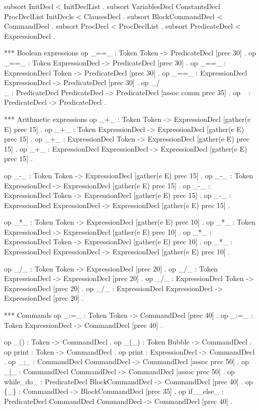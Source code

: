 \documentclass[a4paper,openany]{book}
\begin{document}
 subsort InitDecl < InitDeclList .
 subsort VariablesDecl ConstantsDecl ProcDeclList 
         InitDecls < ClausesDecl .
 subsort BlockCommandDecl < CommandDecl .
 subsort ProcDecl < ProcDeclList .
 subsort PredicateDecl < ExpressionDecl .

 *** Boolean expressions
 op _==_ : Token Token -> PredicateDecl [prec 30] .
 op _==_ : Token ExpressionDecl -> PredicateDecl [prec 30] .
 op _==_ : ExpressionDecl Token -> PredicateDecl [prec 30] .
 op _==_ : ExpressionDecl ExpressionDecl -> PredicateDecl 
           [prec 30] .
 op _/\\_ : PredicateDecl PredicateDecl -> PredicateDecl 
           [assoc comm prec 35] .
 op ~ : PredicateDecl -> PredicateDecl .

 *** Arithmetic expressions
 op _+_ : Token Token -> ExpressionDecl [gather(e E) prec 15] .
 op _+_ : Token ExpressionDecl -> ExpressionDecl [gather(e E) prec 15] .
 op _+_ : ExpressionDecl Token -> ExpressionDecl [gather(e E) prec 15] .
 op _+_ : ExpressionDecl ExpressionDecl -> ExpressionDecl 
          [gather(e E) prec 15] .

 op _-_ : Token Token -> ExpressionDecl  [gather(e E) prec 15] .
 op _-_ : Token ExpressionDecl -> ExpressionDecl [gather(e E) prec 15] .
 op _-_ : ExpressionDecl Token -> ExpressionDecl [gather(e E) prec 15] .
 op _-_ : ExpressionDecl ExpressionDecl -> ExpressionDecl 
          [gather(e E) prec 15] .

 op _*_ : Token Token -> ExpressionDecl [gather(e E) prec 10] .
 op _*_ : Token ExpressionDecl -> ExpressionDecl [gather(e E) prec 10] .
 op _*_ : ExpressionDecl Token -> ExpressionDecl [gather(e E) prec 10] .
 op _*_ : ExpressionDecl ExpressionDecl -> ExpressionDecl 
          [gather(e E) prec 10] .

 op _/_ : Token Token -> ExpressionDecl [prec 20] .
 op _/_ : Token ExpressionDecl -> ExpressionDecl [prec 20] .
 op _/_ : ExpressionDecl Token -> ExpressionDecl [prec 20] .
 op _/_ : ExpressionDecl ExpressionDecl -> ExpressionDecl [prec 20] .

 *** Commands
 op _:=_ : Token Token -> CommandDecl [prec 40] .
 op _:=_ : Token ExpressionDecl -> CommandDecl [prec 40] .

 op _() : Token -> CommandDecl .
 op _(_) : Token Bubble -> CommandDecl .
 op print : Token -> CommandDecl .
 op print : ExpressionDecl -> CommandDecl .
 op _;_ : CommandDecl CommandDecl -> CommandDecl [assoc prec 50] .
 op _|_ : CommandDecl CommandDecl -> CommandDecl [assoc prec 50] .
 op while_do_ : PredicateDecl BlockCommandDecl -> CommandDecl [prec 40] .
 op \{_\} : CommandDecl -> BlockCommandDecl [prec 35] .
 op if__else_ : PredicateDecl CommandDecl CommandDecl -> CommandDecl 
    [prec 40] .
\end{document}
